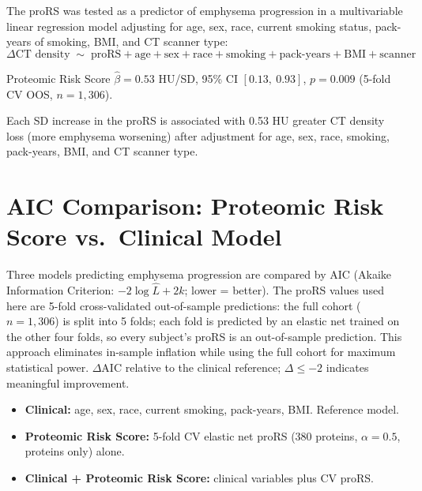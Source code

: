 \documentclass[11pt, letterpaper]{article}
\begin{document}
The proRS was tested as a predictor of emphysema progression in a
multivariable linear regression model adjusting for age, sex, race,
current smoking status, pack-years of smoking, BMI, and CT scanner type:
\[
  \Delta\text{CT density} \;\sim\; \text{proRS} +
  \text{age} + \text{sex} + \text{race} + \text{smoking} +
  \text{pack-years} + \text{BMI} + \text{scanner}
\]

\noindent Proteomic Risk Score $\hat\beta = 0.53$ HU/SD,
95\% CI $[0.13,\ 0.93]$, $p = 0.009$ (5-fold CV OOS, $n = 1{,}306$).

Each SD increase in the proRS is associated with 0.53 HU greater CT
density loss (more emphysema worsening) after adjustment for age, sex,
race, smoking, pack-years, BMI, and CT scanner type.

\section*{AIC Comparison: Proteomic Risk Score vs.\ Clinical Model}

Three models predicting emphysema progression are compared by AIC
(Akaike Information Criterion: $-2\log\hat{L} + 2k$; lower = better).
The proRS values used here are 5-fold cross-validated out-of-sample
predictions: the full cohort ($n = 1{,}306$) is split into 5 folds;
each fold is predicted by an elastic net trained on the other four
folds, so every subject's proRS is an out-of-sample prediction. This
approach eliminates in-sample inflation while using the full cohort
for maximum statistical power. $\Delta$AIC relative to the clinical
reference; $\Delta \leq -2$ indicates meaningful improvement.

\begin{itemize}
  \item \textbf{Clinical:} age, sex, race, current smoking, pack-years,
    BMI. Reference model.
  \item \textbf{Proteomic Risk Score:} 5-fold CV elastic net proRS
    (380 proteins, $\alpha = 0.5$, proteins only) alone.
  \item \textbf{Clinical + Proteomic Risk Score:} clinical variables plus
    CV proRS.
\end{itemize}
\end{document}

